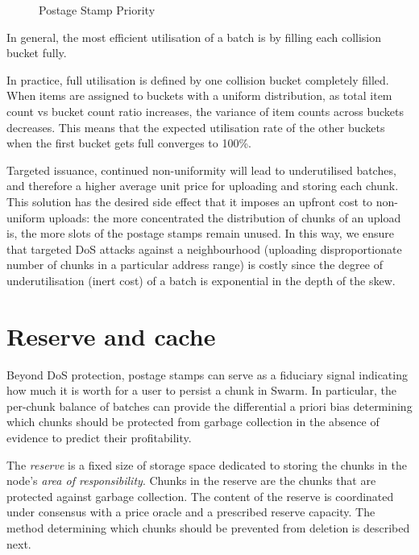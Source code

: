 \begin{figure}[!ht]
  \centering
    
  \caption[Postage Stamp Priority]{Postage Stamp Priority}
\label{fig:prefix-collision}
\end{figure}    



In general, the most efficient utilisation of a batch is by filling each collision bucket fully.

In practice, full utilisation is defined by one collision bucket completely filled. When items are assigned to buckets with a uniform distribution, as total item count vs bucket count ratio increases, the variance of item counts across buckets decreases. This means that the expected utilisation rate of the other buckets when the first bucket gets full converges to 100\%.

Targeted issuance, continued non-uniformity will lead to underutilised batches, and therefore a higher average unit price for uploading and storing each chunk. This solution has the desired side effect that it imposes an upfront cost to non-uniform uploads: the more concentrated the distribution of chunks of an upload is, the more slots of the postage stamps remain unused. In this way, we ensure that targeted DoS attacks against a neighbourhood (uploading disproportionate number of chunks in a particular address range) is costly since the degree of underutilisation (inert cost) of a batch is exponential in the depth of the skew.


\section{Reserve and cache}\label{sec:reserve}

Beyond DoS protection, postage stamps can serve as a fiduciary signal indicating how much it is worth for a user to persist a chunk in Swarm. In particular, the per-chunk balance of batches can provide the differential a priori bias determining which chunks should be protected from garbage collection in the absence of evidence to predict their profitability. 

The \emph{reserve} is a fixed size of storage space dedicated to storing the chunks in the node's \emph{area of responsibility}. Chunks in the reserve are the chunks that are protected against garbage collection. The content of the reserve is coordinated under consensus with a price oracle and a prescribed reserve capacity. The method determining which chunks should be prevented from deletion is described next.

